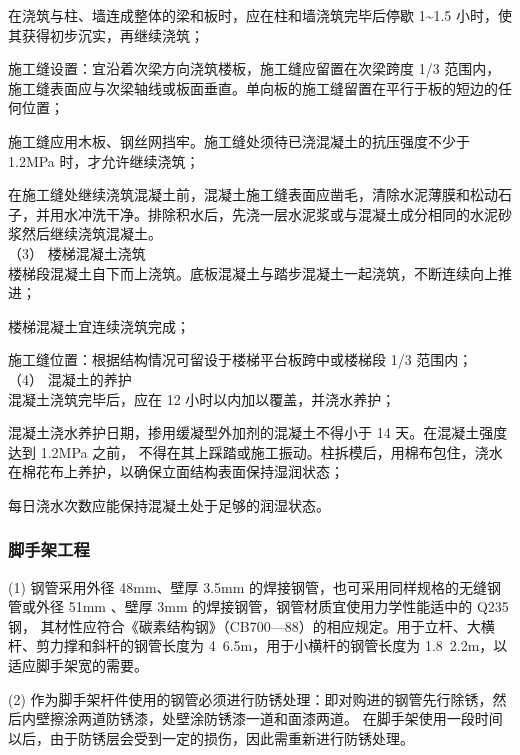  在浇筑与柱、墙连成整体的梁和板时，应在柱和墙浇筑完毕后停歇 1\textasciitilde1.5 小时，使其获得初步沉实，再继续浇筑；

 施工缝设置：宜沿着次梁方向浇筑楼板，施工缝应留置在次梁跨度 1/3 范围内，施工缝表面应与次梁轴线或板面垂直。单向板的施工缝留置在平行于板的短边的任何位置；

 施工缝应用木板、钢丝网挡牢。施工缝处须待已浇混凝土的抗压强度不少于 1.2MPa 时，才允许继续浇筑；

 在施工缝处继续浇筑混凝土前，混凝土施工缝表面应凿毛，清除水泥薄膜和松动石子，并用水冲洗干净。排除积水后，先浇一层水泥浆或与混凝土成分相同的水泥砂浆然后继续浇筑混凝土。\\

（3） 楼梯混凝土浇筑\\

 楼梯段混凝土自下而上浇筑。底板混凝土与踏步混凝土一起浇筑，不断连续向上推进；

 楼梯混凝土宜连续浇筑完成；

 施工缝位置：根据结构情况可留设于楼梯平台板跨中或楼梯段 1/3 范围内； \\

（4） 混凝土的养护\\

 混凝土浇筑完毕后，应在 12 小时以内加以覆盖，并浇水养护；

 混凝土浇水养护日期，掺用缓凝型外加剂的混凝土不得小于 14 天。在混凝土强度达到 1.2MPa 之前，
不得在其上踩踏或施工振动。柱拆模后，用棉布包住，浇水在棉花布上养护，以确保立面结构表面保持湿润状态；

 每日浇水次数应能保持混凝土处于足够的润湿状态。


\subsubsection{脚手架工程}

(1)  钢管采用外径 48mm、壁厚 3.5mm 的焊接钢管，也可采用同样规格的无缝钢管或外径 51mm 、壁厚 3mm 的焊接钢管，钢管材质宜使用力学性能适中的 Q235 钢，
其材性应符合《碳素结构钢》（CB700—88）的相应规定。用于立杆、大横杆、剪力撑和斜杆的钢管长度为 4~6.5m，用于小横杆的钢管长度为 1.8~2.2m，以适应脚手架宽的需要。

(2)  作为脚手架杆件使用的钢管必须进行防锈处理：即对购进的钢管先行除锈，然后内壁擦涂两道防锈漆，处壁涂防锈漆一道和面漆两道。
在脚手架使用一段时间以后，由于防锈层会受到一定的损伤，因此需重新进行防锈处理。

